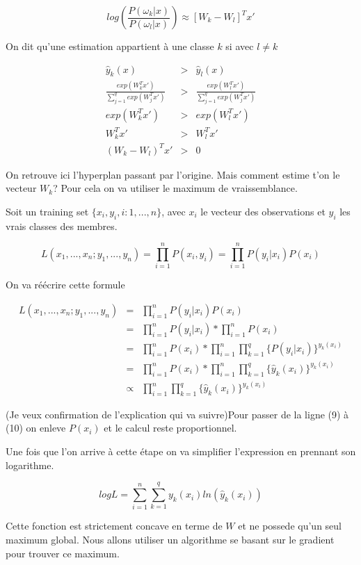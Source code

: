 \documentclass[a4paper, 11pt, onecolumn]{article}
\begin{document}
\begin{enumerate}
$$log(\frac{P(\omega_k|x)}{P(\omega_l|x)}) \approx [W_k-W_l]^T x'$$

On dit qu'une estimation appartient à une classe $k$ si avec $l \neq k$

\begin{eqnarray}
	\widehat{y}_k(x) &>& \widehat{y}_l(x) \\
	\frac{exp(W_k^Tx')}{\sum_{j=1}^q exp(W_j^Tx')} &>& \frac{exp(W_l^Tx')}{\sum_{j=1}^q exp(W_j^Tx')} \\
	exp(W_k^Tx') &>& exp(W_l^Tx') \\
	W_k^Tx' &>& W_l^Tx' \\
	(W_k - W_l)^T x' &>& 0
\end{eqnarray}

On retrouve ici l'hyperplan passant par l'origine. Mais comment estime t'on le vecteur $W_k$? Pour cela on va utiliser le maximum de vraissemblance.

Soit un training set $\{x_i, y_i, i: 1, ..., n\}$, avec $x_i$ le vecteur des observations et $y_i$ les vrais classes des membres.

$$L(x_1, ..., x_n; y_1, ..., y_n) = \prod_{i=1}^n P(x_i, y_i) = \prod_{i=1}^n P(y_i|x_i) P(x_i)$$

On va réécrire cette formule

\begin{eqnarray}
	L(x_1, ..., x_n; y_1, ..., y_n) &=& \prod_{i=1}^n P(y_i|x_i) P(x_i)\\
	&=& \prod_{i=1}^n P(y_i|x_i) * \prod_{i=1}^n P(x_i) \\
	&=& \prod_{i=1}^n P(x_i) * \prod_{i=1}^n \prod_{k=1}^q \{P(y_i|x_i)\}^{y_k(x_i)} \\
&=& \prod_{i=1}^n P(x_i) * \prod_{i=1}^n \prod_{k=1}^q \{\widehat{y}_k(x_i)\}^{y_k(x_i)} \\
&\propto& \prod_{i=1}^n \prod_{k=1}^q \{\widehat{y}_k(x_i)\}^{y_k(x_i)}
\end{eqnarray}

(Je veux confirmation de l'explication qui va suivre)Pour passer de la ligne (9) à (10) on enleve $P(x_i)$ et le calcul reste proportionnel.

Une fois que l'on arrive à cette étape on va simplifier l'expression en prennant son logarithme.

$$log L = \sum_{i=1}^n \sum_{k=1}^q y_k(x_i)ln(\widehat{y}_k(x_i))$$

Cette fonction est strictement concave en terme de $W$ et ne possede qu'un seul maximum global. Nous allons utiliser un algorithme se basant sur le gradient pour trouver ce maximum. 


\end{enumerate}
\end{document}

